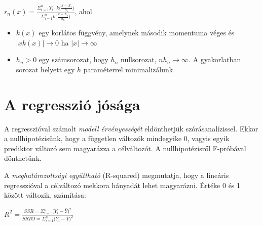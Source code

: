 $r_n(x) = \frac{\Sigma_{i=1}^n Y_i \cdot k\Big(\frac{x-X_i}{h_n}\Big)}{\Sigma_{i=1}^n k\Big(\frac{x-X_i}{h_n}\Big)}$, ahol
\begin{itemize}
\item $k(x)$ egy korlátos függvény, amelynek második momentuma véges és $|xk(x)| \rightarrow 0$ ha $|x| \rightarrow \infty$
\item $h_n>0$ egy számsorozat, hogy $h_n$ nullsorozat, $nh_n \rightarrow \infty$. A gyakorlatban sorozat helyett egy $h$ paraméterrel minimalizálunk
\end{itemize}

\section{A regresszió jósága}

A regresszióval számolt \emph{modell érvényességét} eldönthetjük szórásanalízissel. Ekkor a nullhipotézisünk, hogy a független változók mindegyike 0, vagyis egyik prediktor változó sem magyarázza a célváltozót. A nullhipotézisről F-próbával dönthetünk.

A \emph{meghatározottsági együttható} (R-squared) megmutatja, hogy a lineáris regresszióval a célváltozó mekkora hányadát lehet magyarázni. Értéke 0 és 1 között változik, számítása:

$R^2 = \frac{SSR = \Sigma_{i=1}^n\big(\tilde{Y}_i - \bar{Y}  \big)^2}{SSTO = \Sigma_{i=1}^n\big(Y_i - \bar{Y}  \big)^2}$
